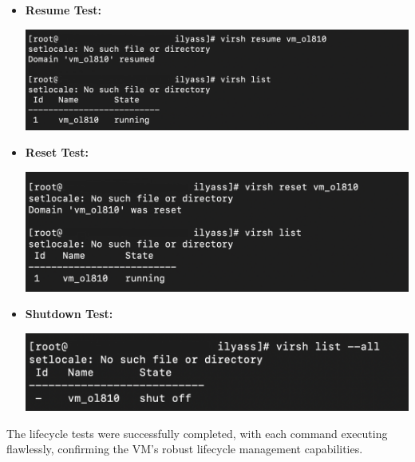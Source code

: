 \begin{itemize}
    \item \textbf{Resume Test:}
          \begin{center}
              \includegraphics[width=\linewidth]{Images/Resume using libvirt.png}
              \label{fig:areboot}
          \end{center}

    \item \textbf{Reset Test:}
          \begin{center}
              \includegraphics[width=\linewidth]{Images/Reset Using libvirt.png}
              \label{fig:areboot}
          \end{center}

    \item \textbf{Shutdown Test:}
          \begin{center}
              \includegraphics[width=\linewidth]{Images/Shutdown using Libvirt.png}
              \label{fig:areboot}
          \end{center}
\end{itemize}

The lifecycle tests were successfully completed, with each command executing flawlessly, confirming the VM’s robust lifecycle management capabilities.

